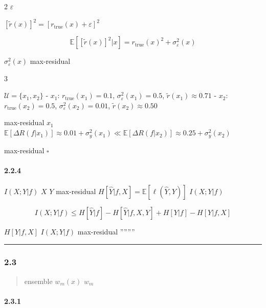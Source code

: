 \documentclass[
  12pt,
]{article}
\begin{document}
 2 \(\varepsilon\) 


\([\tilde{r}(x)]^2 = [r_{\text{true}}(x) + \varepsilon]^2\) 

\[\mathbb{E}[[\tilde{r}(x)]^2 | x] = r_{\text{true}}(x)^2 + \sigma_\varepsilon^2(x)\]

 \(\sigma_\varepsilon^2(x)\) max-residual
\textbf{}

 3

 \(\mathcal{U} = \{x_1, x_2\}\) - \(x_1\):
\(r_{\text{true}}(x_1) = 0.1\), \(\sigma_\varepsilon^2(x_1) = 0.5\),
\(\tilde{r}(x_1) \approx 0.71\) - \(x_2\):
\(r_{\text{true}}(x_2) = 0.5\), \(\sigma_\varepsilon^2(x_2) = 0.01\),
\(\tilde{r}(x_2) \approx 0.50\)

 max-residual  \(x_1\)
\(\mathbb{E}[\Delta R(f|x_1)] \approx 0.01 + \sigma_y^2(x_1) \ll \mathbb{E}[\Delta R(f|x_2)] \approx 0.25 + \sigma_y^2(x_2)\)

 max-residual \textbf{}\(\square\)

\paragraph{2.2.4
}\label{ux4fe1ux606fux8bbaux89c6ux89d2ux7684ux8865ux5145ux8bc1ux660e}

 \(I(X; Y | f)\)  \(X\)  \(Y\)
max-residual 
\(H[\hat{Y} | f, X] = \mathbb{E}[\ell(\hat{Y}, Y)]\)
\(I(X; Y|f)\)



\[I(X; Y | f) \leq H[\hat{Y}|f] - H[\hat{Y}|f, X, Y] + H[Y|f] - H[Y|f, X]\]

\(H[Y|f, X]\)  \(I(X; Y|f)\) max-residual
''''''''

\begin{center}\rule{0.5\linewidth}{0.5pt}\end{center}

\subsubsection{2.3
}\label{ux547dux9898ux4e09ux72b6ux6001ux6761ux4ef6ux4e13ux5bb6ux6743ux91cdux4f18ux4e8eux5168ux5c40ux56faux5b9aux6743ux91cd}

\begin{quote}
\textbf{}ensemble \(w_m(x)\)
 \(w_m\)
\end{quote}

\paragraph{2.3.1 }\label{ux5f62ux5f0fux5316ux8bbeux5b9a}
\end{document}

